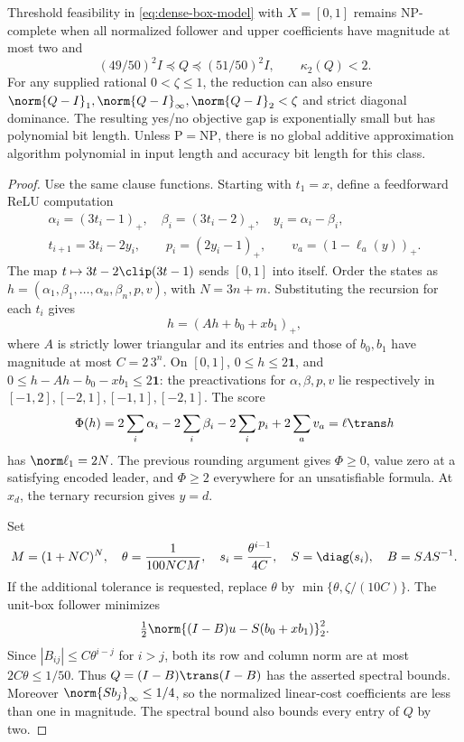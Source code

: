 \begin{theorem}\label{thm:conditioned-hardness}
Threshold feasibility in \eqref{eq:dense-box-model} with \(X=[0,1]\) remains NP-complete when
all normalized follower and upper coefficients have magnitude at most two and
\[
 (49/50)^2 I\preceq Q\preceq(51/50)^2 I,\qquad \kappa_2(Q)<2.
\]
For any supplied rational \(0<\zeta\le1\), the reduction can also ensure
\(\norm{Q-I}_1,\norm{Q-I}_\infty,\norm{Q-I}_2<\zeta\) and strict diagonal
dominance. The resulting yes/no objective gap is exponentially small but has
polynomial bit length. Unless \(\mathrm P=\mathrm{NP}\), there is no global
additive approximation algorithm polynomial in input length and accuracy bit
length for this class.
\end{theorem}
\begin{proof}
Use the same clause functions. Starting with \(t_1=x\), define a feedforward
ReLU computation
\[
 \begin{gathered}
 \alpha_i=(3t_i-1)_+,\quad \beta_i=(3t_i-2)_+,\quad y_i=\alpha_i-\beta_i,\\
 t_{i+1}=3t_i-2y_i,\qquad p_i=(2y_i-1)_+,\qquad v_a=(1-\ell_a(y))_+.
 \end{gathered}
\]
The map \(t\mapsto3t-2\clip(3t-1)\) sends \([0,1]\) into itself.
Order the states as \(h=(\alpha_1,\beta_1,\ldots,\alpha_n,\beta_n,p,v)\),
with \(N=3n+m\). Substituting the recursion for each \(t_i\) gives
\[
 h=(Ah+b_0+xb_1)_+,
\]
where \(A\) is strictly lower triangular and its entries and those of \(b_0,b_1\)
have magnitude at most \(C=2\,3^n\). On \([0,1]\),
\(0\le h\le2\mathbf1\), and
\(0\le h-Ah-b_0-xb_1\le2\mathbf1\): the preactivations for \(\alpha,\beta,p,v\)
lie respectively in \([-1,2],[-2,1],[-1,1],[-2,1]\).
The score
\[
 \Phi(h)=2\sum_i\alpha_i-2\sum_i\beta_i-2\sum_i p_i+2\sum_a v_a
          =\ell\trans h
\]
has \(\norm\ell_1=2N\). The previous rounding argument gives \(\Phi\ge0\),
value zero at a satisfying encoded leader, and \(\Phi\ge2\) everywhere for an
unsatisfiable formula. At \(x_d\), the ternary recursion gives \(y=d\).

Set
\[
 M=(1+NC)^N,\quad \theta=\frac1{100NCM},\quad
 s_i=\frac{\theta^{i-1}}{4C},\quad S=\diag(s_i),\quad B=SAS^{-1}.
\]
If the additional tolerance is requested, replace \(\theta\) by
\(\min\{\theta,\zeta/(10C)\}\). The unit-box follower minimizes
\begin{equation}\label{eq:scaled-network-energy}
 \tfrac12\norm{(I-B)u-S(b_0+xb_1)}_2^2.
\end{equation}
Since \(|B_{ij}|\le C\theta^{i-j}\) for \(i>j\), both its row and column norm
are at most \(2C\theta\le1/50\). Thus \(Q=(I-B)\trans(I-B)\) has the asserted
spectral bounds. Moreover \(\norm{Sb_j}_\infty\le1/4\), so the normalized
linear-cost coefficients are less than one in magnitude. The spectral bound
also bounds every entry of \(Q\) by two.


\end{proof}
